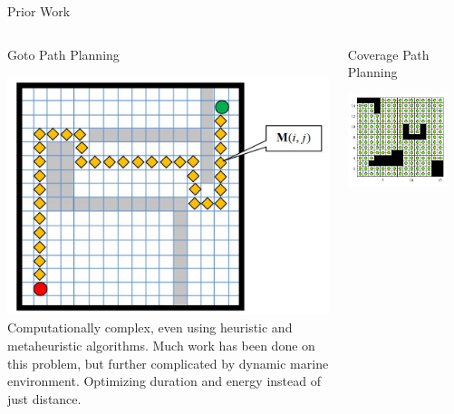 \documentclass[9pt]{beamer}
\begin{document}
\begin{frame}{Prior Work} \label{PW:planning}
    \begin{columns}
        \begin{column}{0.45\textwidth}
            \begin{block}{Goto Path Planning}
                \begin{center}
                    \includegraphics[width=\textwidth,trim={1cm 2cm 5cm 2cm},clip]{img/pathplanning.jpg}
                    \linebreak
                    Computationally complex, even using heuristic and metaheuristic algorithms. 
                    Much work has been done on this problem, but further complicated by dynamic marine environment.
                    Optimizing duration and energy instead of just distance. 
                \end{center}
            \end{block}
        \end{column}
        \begin{column}{0.45\textwidth}
            \begin{block}{Coverage Path Planning}
                \begin{center}
                    \includegraphics[width=0.85\textwidth,trim={1cm 2cm 2cm 1cm},clip]{img/coverageplanning.png}

\end{center}
\end{block}
\end{column}
\end{columns}
\end{frame}
\end{document}
